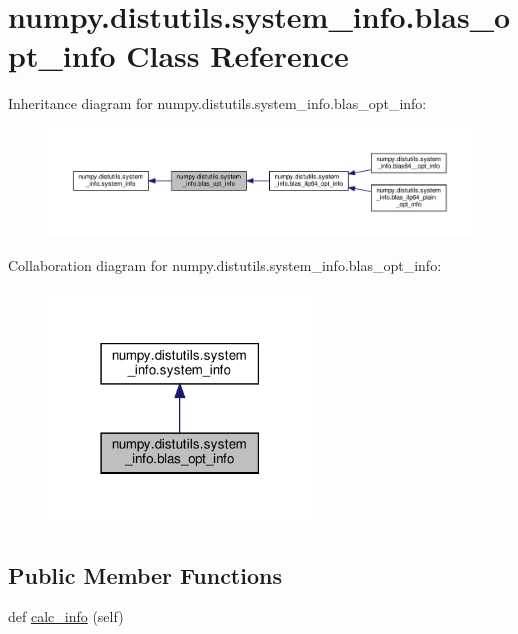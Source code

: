 \hypertarget{classnumpy_1_1distutils_1_1system__info_1_1blas__opt__info}{}\section{numpy.\+distutils.\+system\+\_\+info.\+blas\+\_\+opt\+\_\+info Class Reference}
\label{classnumpy_1_1distutils_1_1system__info_1_1blas__opt__info}


Inheritance diagram for numpy.\+distutils.\+system\+\_\+info.\+blas\+\_\+opt\+\_\+info\+:
\nopagebreak
\begin{figure}[H]
\begin{center}
\leavevmode
\includegraphics[width=350pt]{classnumpy_1_1distutils_1_1system__info_1_1blas__opt__info__inherit__graph}
\end{center}
\end{figure}


Collaboration diagram for numpy.\+distutils.\+system\+\_\+info.\+blas\+\_\+opt\+\_\+info\+:
\nopagebreak
\begin{figure}[H]
\begin{center}
\leavevmode
\includegraphics[width=198pt]{classnumpy_1_1distutils_1_1system__info_1_1blas__opt__info__coll__graph}
\end{center}
\end{figure}
\subsection*{Public Member Functions}
\begin{DoxyCompactItemize}
\item 
def \hyperlink{classnumpy_1_1distutils_1_1system__info_1_1blas__opt__info_a748d878ac9b4a36c9f5385615742f94a}{calc\+\_\+info} (self)
\end{DoxyCompactItemize}
